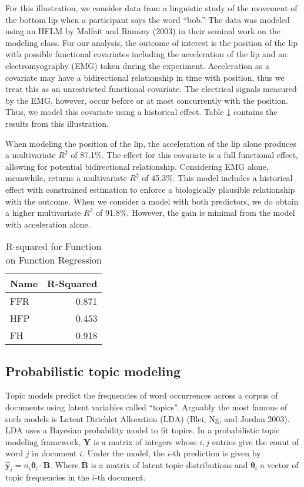 For this illustration, we consider data from a linguistic study of the movement of the bottom lip when a participant says the word ``bob.'' The data was modeled using an HFLM by Malfait and Ramsay (2003) in their seminal work on the modeling class. For our analysis, the outcome of interest is the position of the lip with possible functional covariates including the acceleration of the lip and an electromyography (EMG) taken during the experiment. Acceleration as a covariate may have a bidirectional relationship in time with position, thus we treat this as an unrestricted functional covariate. The electrical signals measured by the EMG, however, occur before or at most concurrently with the position. Thus, we model this covariate using a historical effect. Table \ref{tab:ffr} contains the results from this illustration.

When modeling the position of the lip, the acceleration of the lip alone produces a multivariate \(R^2\) of 87.1\%. The effect for this covariate is a full functional effect, allowing for potential bidirectional relationship. Considering EMG alone, meanwhile, returns a multivariate \(R^2\) of 45.3\%. This model includes a historical effect with constrained estimation to enforce a biologically plausible relationship with the outcome. When we consider a model with both predictors, we do obtain a higher multivariate \(R^2\) of 91.8\%. However, the gain is minimal from the model with acceleration alone.

\begin{table}

\caption{\label{tab:ffr}R-squared for Function on Function Regression}
\centering
\begin{tabular}[t]{l|r}
\hline
Name & R-Squared\\
\hline
FFR & 0.871\\
\hline
HFP & 0.453\\
\hline
FH & 0.918\\
\hline
\end{tabular}
\end{table}

\hypertarget{probabilistic-topic-modeling}{%
\subsection{Probabilistic topic modeling}\label{probabilistic-topic-modeling}}

Topic models predict the frequencies of word occurrences across a corpus of documents using latent variables called ``topics''. Arguably the most famous of such models is Latent Dirichlet Allocation (LDA) (Blei, Ng, and Jordan 2003). LDA uses a Bayesian probability model to fit topics. In a probabilistic topic modeling framework, \(\boldsymbol{Y}\) is a matrix of integers whose \(i,j\) entries give the count of word \(j\) in document \(i\). Under the model, the \(i\)-th prediction is given by \(\hat{\boldsymbol{y}}_i = n_i \boldsymbol{\theta}_i \cdot \boldsymbol{B}\). Where \(\boldsymbol{B}\) is a matrix of latent topic distributions and \(\boldsymbol{\theta}_i\) a vector of topic frequencies in the \(i\)-th document.

